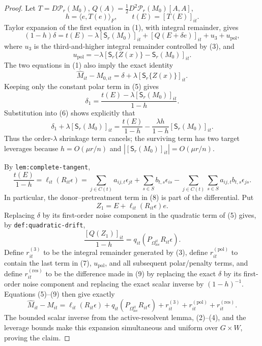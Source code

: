 \documentclass{article}
\begin{document}
\begin{proof}
Let \(T=D\mathcal P_r(M_0)\), \(Q(A)=\tfrac12D^2\mathcal P_r(M_0)[A,A]\),
\[
 h=\langle e,T(e)\rangle_F,
 \qquad t(E)=[T(E)]_{it}.
\]
Taylor expansion of the first equation in (1), with integral remainder, gives
\[
 (1-h)\delta
 =t(E)-\lambda[\mathsf S_r(M_0)]_{it}
   +[Q(E+\delta e)]_{it}+u_3+u_{\mathrm{pol}},
 \tag{5}
\]
where \(u_3\) is the third-and-higher integral remainder controlled by (3), and
\[
 u_{\mathrm{pol}}
 =-\lambda[\mathsf S_r\{Z(x)\}-\mathsf S_r(M_0)]_{it}.
\]
The two equations in (1) also imply the exact identity
\[
 \widehat M_{it}-M_{0,it}
 =\delta+\lambda[\mathsf S_r\{Z(x)\}]_{it}.
 \tag{6}
\]
Keeping only the constant polar term in (5) gives
\[
 \delta_1=\frac{t(E)-\lambda[\mathsf S_r(M_0)]_{it}}{1-h}.
\]
Substitution into (6) shows explicitly that
\[
 \delta_1+\lambda[\mathsf S_r(M_0)]_{it}
 =\frac{t(E)}{1-h}
  -\frac{\lambda h}{1-h}[\mathsf S_r(M_0)]_{it}.
 \tag{7}
\]
Thus the order-\(\lambda\) shrinkage term cancels; the surviving term has two target leverages because \(h=O(\mu r/n)\) and \(|[\mathsf S_r(M_0)]_{it}|=O(\mu r/n)\).

By \texttt{lem:complete-tangent},
\[
 \frac{t(E)}{1-h}=\ell_{it}(R_{it}\epsilon)
 =\sum_{j\in C(t)}a_{ij,t}\epsilon_{jt}
  +\sum_{s\in S}b_{t,s}\epsilon_{is}
  -\sum_{j\in C(t)}\sum_{s\in S}a_{ij,t}b_{t,s}\epsilon_{js}.
 \tag{8}
\]
In particular, the donor--pretreatment term in (8) is part of the differential.  Put
\[
 Z_1=E+\ell_{it}(R_{it}\epsilon)e.
\]
Replacing \(\delta\) by its first-order noise component in the quadratic term of (5) gives, by \texttt{def:quadratic-drift},
\[
 \frac{[Q(Z_1)]_{it}}{1-h}
 =q_{it}(P_{\Omega_{\mathrm{loc}}^{it}}R_{it}\epsilon).
 \tag{9}
\]
Define \(r^{(3)}_{it}\) to be the integral remainder generated by (3), define \(r^{(\mathrm{pol})}_{it}\) to contain the last term in (7), \(u_{\mathrm{pol}}\), and all subsequent polar/penalty terms, and define \(r^{(\mathrm{res})}_{it}\) to be the difference made in (9) by replacing the exact \(\delta\) by its first-order noise component and replacing the exact scalar inverse by \((1-h)^{-1}\).  Equations (5)--(9) then give exactly
\[
 \widehat M_{it}-M_{it}
 =\ell_{it}(R_{it}\epsilon)
  +q_{it}(P_{\Omega_{\mathrm{loc}}^{it}}R_{it}\epsilon)
  +r^{(3)}_{it}+r^{(\mathrm{pol})}_{it}+r^{(\mathrm{res})}_{it}.
\]
The bounded scalar inverse from the active-resolvent lemma, (2)--(4), and the leverage bounds make this expansion simultaneous and uniform over \(G\times W\), proving the claim.
\end{proof}
\end{document}
